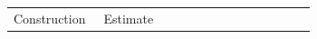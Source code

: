 \begin{table}[!ht]\small\begin{tabular}{@{}p{0.28\linewidth}p{0.66\linewidth}@{}}Construction & Estimate \\ \end{tabular}\end{table}
